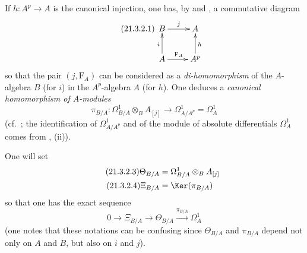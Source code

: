 \begin{env}[21.3.2]
\label{0.21.3.2}
If $h:A^p\to A$ is the canonical injection, one has, by  and , a commutative diagram
\begin{equation}
\tag{21.3.2.1}
  \label{0.21.3.2.1}
\xymatrix{
  B \ar[r]^{j} & A \\
  A \ar[u]^{i} \ar[r]^{\mathrm{F}_A} & A^p \ar[u]_{h}
}
\end{equation}
so that the pair $(j,\mathrm{F}_A)$ can be considered as a \emph{di-homomorphism} of the $A$-algebra $B$ (for $i$) in the $A^p$-algebra $A$ (for $h$).
One deduces a \emph{canonical homomorphism of $A$-modules}
\begin{equation}
\tag{21.3.2.2}
  \label{0.21.3.2.2}
  \pi_{B/A}:\Omega^1_{B/A}\otimes_B A_{[j]}\to\Omega^1_{A/A^p}=\Omega^1_A
\end{equation}
(cf.\ ; the identification of $\Omega^1_{A/A^p}$ and of the module of absolute differentials $\Omega^1_A$ comes from , (ii)).

One will set
\begin{align}
\tag{21.3.2.3}
  \label{0.21.3.2.3}
  \Theta_{B/A}&=\Omega^1_{B/A}\otimes_B A_{[j]} \\
\tag{21.3.2.4}
  \label{0.21.3.2.4}
  \Xi_{B/A}&=\Ker(\pi_{B/A})
\end{align}
so that one has the exact sequence
\begin{equation}
\tag{21.3.2.5}
  \label{0.21.3.2.5}
  0\to\Xi_{B/A}\to\Theta_{B/A}\xrightarrow{\pi_{B/A}}\Omega^1_A
\end{equation}
(one notes that these notations can be confusing since $\Theta_{B/A}$ and $\pi_{B/A}$ depend not only on $A$ and $B$, but also on $i$ and $j$).
\end{env}

